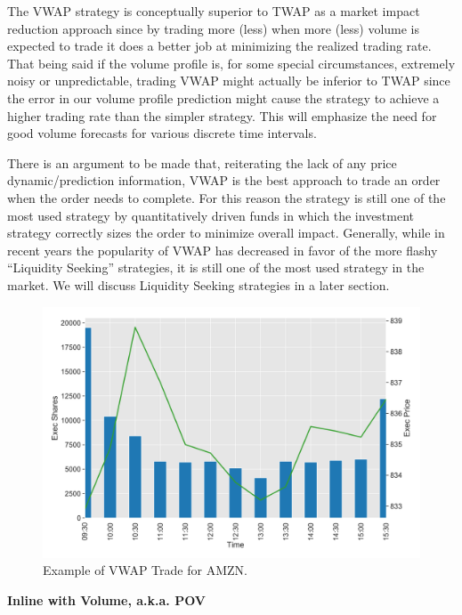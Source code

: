 The VWAP strategy is conceptually superior to TWAP as a market impact reduction approach since by trading more (less) when more  (less) volume is expected to trade it does a better job at minimizing the realized trading rate. That being said if the volume profile is, for some special circumstances, extremely noisy or unpredictable, trading VWAP might actually be inferior to TWAP since the error in our volume profile prediction might cause the strategy to achieve a higher trading rate than the simpler strategy. This will emphasize the need for good volume forecasts for various discrete time intervals.


There is an argument to be made that, reiterating the lack of any price dynamic/prediction information, VWAP is the best approach to trade an order when the order needs to complete. For this reason the strategy is still one of the most used strategy by quantitatively driven funds in which the investment strategy correctly sizes the order to minimize overall impact. Generally, while in recent years the popularity of VWAP has decreased in favor of the more flashy ``Liquidity Seeking'' strategies, it is still one of the most used strategy in the market. We will discuss Liquidity Seeking strategies in a later section. \twomedskip


        \begin{figure}[!ht]
        \centering
        \includegraphics[width=\textwidth]{chapters/chapter_exec_models/figures/vwap.png} 
        \caption{Example of VWAP Trade for AMZN. \label{fig:vwap}}
        \end{figure}


\noindent\textbf{Inline with Volume, a.k.a. POV} \twomedskip


